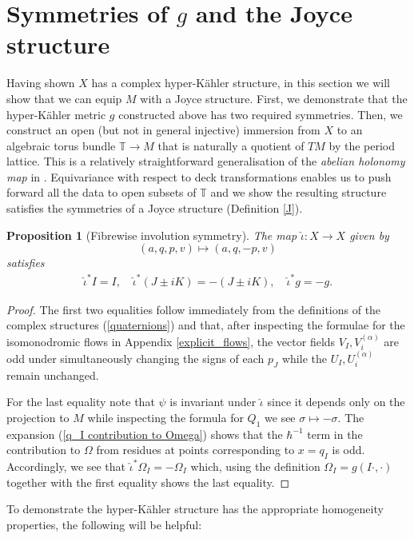 \documentclass[a4paper,12pt,reqno]{amsart}
\newcounter{counter2}
\numberwithin{equation}{section}
\numberwithin{counter2}{section}
\newcounter{counter3}
\newtheorem{prop}[counter2]{Proposition}
\begin{document}
\section{Symmetries of $g$ and the Joyce structure} \label{Joyce_finalisation}
Having shown $X$ has a complex hyper-K\"ahler structure,  in this section we will show that we can equip $M$ with a Joyce structure.  First,  we demonstrate that the hyper-K\"ahler metric $g$ constructed above has two required symmetries.  Then,  we construct an open (but not in general injective) immersion from $X$ to an algebraic torus bundle $\mathbb{T} \to M$ that is naturally a quotient of $TM$ by the period lattice.  This is a relatively straightforward generalisation of the \textit{abelian holonomy map} in \cite{BM}.  Equivariance with respect to deck transformations enables us to push forward all the data to open subsets of $\mathbb{T}$ and we show the resulting structure satisfies the symmetries of a Joyce structure (Definition \ref{J}). 
\begin{prop}[Fibrewise involution symmetry]\label{Involution1}
The map $\hat{\iota}: X \to X$ given by $$(a,q,p,v) \mapsto (a,q,-p,v)$$ satisfies
\begin{align}
\hat{\iota}^*I=I,  \quad \hat{\iota}^*(J \pm iK) = -(J \pm iK),  \quad \hat{\iota}^*g = -g.  
\end{align}
\end{prop}
\begin{proof}
The first two equalities follow immediately from the definitions of the complex structures (\ref{quaternions}) and that,  after inspecting the formulae for the isomonodromic flows in Appendix \ref{explicit_flows},  the vector fields $V_I,  V_i^{(\alpha)}$ are odd under simultaneously changing the signs of each $p_J$ while the $U_I,  U_i^{(\alpha)}$ remain unchanged.  \par For the last equality note that $\psi$ is invariant under $\hat{\iota}$ since it depends only on the projection to $M$ while inspecting the formula for $Q_1$ we see $\sigma \mapsto -\sigma$.  The expansion (\ref{q_I contribution to Omega}) shows that the $\hbar^{-1}$ term in the contribution to $\Omega$ from residues at points corresponding to $x = q_I$ is odd.   Accordingly,  we see that $\hat{\iota}^*\Omega_I = -\Omega_I$ which,  using the definition $\Omega_{I} = g(I\cdot,\cdot)$ together with the first equality shows the last equality.  
\end{proof}
To demonstrate the hyper-K\"ahler structure has the appropriate homogeneity properties,  the following will be helpful: 
\end{document}
